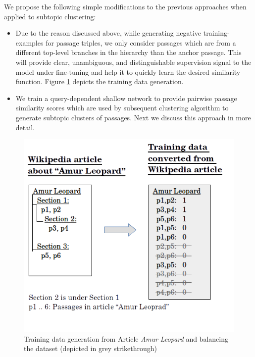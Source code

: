 We propose the following simple modifications to the previous approaches when applied to subtopic clustering:
\begin{itemize}
    \item Due to the reason discussed above, while generating negative  training-examples for passage triples, we only consider passages which are from a different top-level branches in the hierarchy than the anchor passage. This will provide clear, unambiguous, and distinguishable supervision signal to the model under fine-tuning and help it to quickly learn the desired similarity function. Figure \ref{fig:conv} depicts the training data generation.
    \item We train a query-dependent shallow network to provide pairwise passage similarity scores which are used by subsequent clustering algorithm to generate subtopic clusters of passages. Next we discuss this approach in more detail.
\end{itemize}{}
\begin{figure}[h]
  \centering
  \includegraphics[width=\linewidth]{graphics/car_y1_conv.png}
  \caption{Training data generation from Article \textit{Amur Leopard} and balancing the dataset (depicted in grey strikethrough)}
  \label{fig:conv}
\end{figure}

